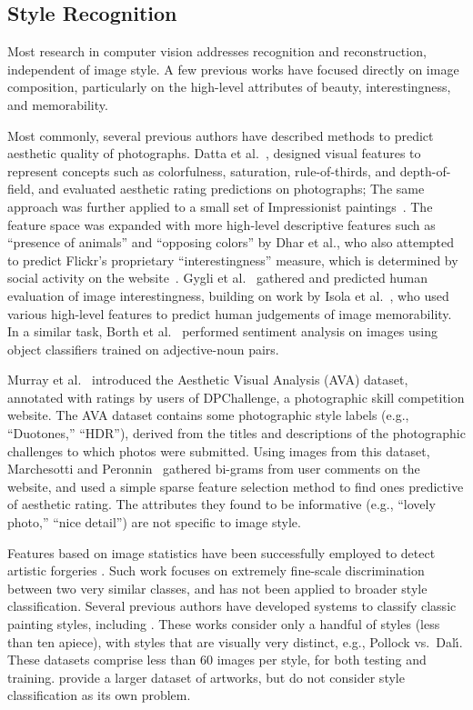 \subsection{Style Recognition}

Most research in computer vision addresses recognition and reconstruction, independent of image style.
A few previous works have focused directly on image composition, particularly on the high-level attributes of beauty, interestingness, and memorability.

Most commonly, several previous authors have described methods to predict aesthetic quality of photographs.
Datta et al.~\parencite{Datta-ECCV-2006}, designed visual features to represent concepts such as colorfulness, saturation, rule-of-thirds, and depth-of-field, and evaluated aesthetic rating predictions on photographs; The same approach was further applied to a small set of Impressionist paintings~\parencite{Li-SP-2009}.
The feature space was expanded with more high-level descriptive features such as ``presence of animals'' and ``opposing colors'' by Dhar et al., who also attempted to predict Flickr's proprietary ``interestingness'' measure, which is determined by social activity on the website~\parencite{Dhar-CVPR-2011}.
Gygli et al.~\parencite{Gygli-ICCV-2013} gathered and predicted human evaluation of image interestingness, building on work by Isola et al.~\parencite{Isola-CVPR-2011}, who used various high-level features to predict human judgements of image memorability.
In a similar task, Borth et al.~\parencite{Borth-MM-2013} performed sentiment analysis on images using object classifiers trained on adjective-noun pairs.

Murray et al.~\parencite{Murray-CVPR-2012} introduced the Aesthetic Visual Analysis (AVA) dataset, annotated with ratings by users of DPChallenge, a photographic skill competition website.
The AVA dataset contains some photographic style labels (e.g., ``Duotones,'' ``HDR''), derived from the titles and descriptions of the photographic challenges to which photos were submitted.
Using images from this dataset, Marchesotti and Peronnin~\parencite{Marchesotti-BMVC-2013} gathered bi-grams from user comments on the website, and used a simple sparse feature selection method to find ones predictive of aesthetic rating.
The attributes they found to be informative (e.g., ``lovely photo,'' ``nice detail'') are not specific to image style.

Features based on image statistics have been successfully employed to detect artistic forgeries \parencite{Lyu-PNAS-2004}.
Such work focuses on extremely fine-scale discrimination between two very similar classes, and has not been applied to broader style classification.
Several previous authors have developed systems to classify classic painting styles, including \parencite{keren2002,shamir2010}.
These works consider only a handful of styles (less than ten apiece), with styles that are visually very distinct, e.g., Pollock vs.~Dal\'{\i}.
These datasets comprise less than 60 images per style, for both testing and training.
\cite{Mensink2014} provide a larger dataset of artworks, but do not consider style classification as its own problem.

